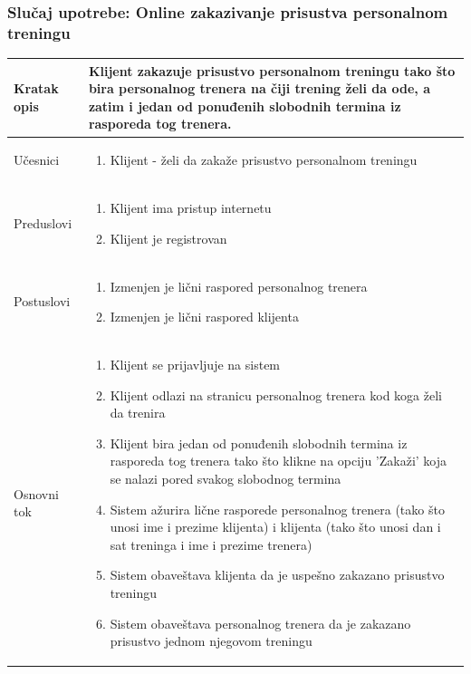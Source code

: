 \subsubsection{Slučaj upotrebe: Online zakazivanje prisustva personalnom treningu}

\begin{longtable}{| p{} | p{} |} 
\hline
    Kratak opis & Klijent zakazuje prisustvo personalnom treningu tako što bira personalnog trenera na čiji trening želi da ode, a zatim i jedan od ponuđenih slobodnih termina iz rasporeda tog trenera. \\ 
\hline    
    Učesnici & 
    \begin{enumerate}
    \item  Klijent - želi da zakaže prisustvo personalnom treningu
    \end{enumerate}\\
\hline
   Preduslovi & 
   \begin{enumerate}
    \item Klijent ima pristup internetu
    \item Klijent je registrovan
   \end{enumerate} \\
\hline  
    Postuslovi & 
    \begin{enumerate}
    \item Izmenjen je lični raspored personalnog trenera
    \item Izmenjen je lični raspored klijenta
   \end{enumerate} \\
\hline
    Osnovni tok &
    \begin{enumerate}
   \item Klijent se prijavljuje na sistem
    \item Klijent odlazi na stranicu personalnog trenera kod koga želi da trenira
    \item Klijent bira jedan od ponuđenih slobodnih termina iz rasporeda tog trenera tako što klikne na opciju 'Zakaži' koja se nalazi pored svakog slobodnog termina
    \item Sistem ažurira lične rasporede personalnog trenera (tako što unosi ime i prezime klijenta) i klijenta (tako što unosi dan i sat treninga i ime i prezime trenera)
    \item Sistem obaveštava klijenta da je uspešno zakazano prisustvo treningu
    \item Sistem obaveštava personalnog trenera da je zakazano prisustvo jednom njegovom treningu

\end{enumerate}
\end{longtable}
